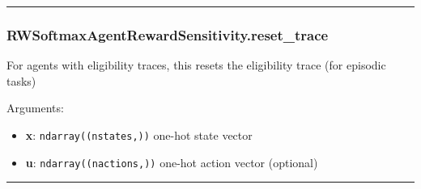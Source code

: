 \begin{center}\rule{0.5\linewidth}{\linethickness}\end{center}

\subsubsection{RWSoftmaxAgentRewardSensitivity.reset\_trace}\label{rwsoftmaxagentrewardsensitivity.reset_trace}

\begin{Shaded}
\begin{Highlighting}[]
\OperatorTok{=}\NormalTok{)}
\end{Highlighting}
\end{Shaded}

For agents with eligibility traces, this resets the eligibility trace
(for episodic tasks)

Arguments:

\begin{itemize}
\tightlist
\item
  \textbf{x}: \texttt{ndarray((nstates,))} one-hot state vector
\item
  \textbf{u}: \texttt{ndarray((nactions,))} one-hot action vector
  (optional)
\end{itemize}

\begin{center}\rule{0.5\linewidth}{\linethickness}\end{center}
